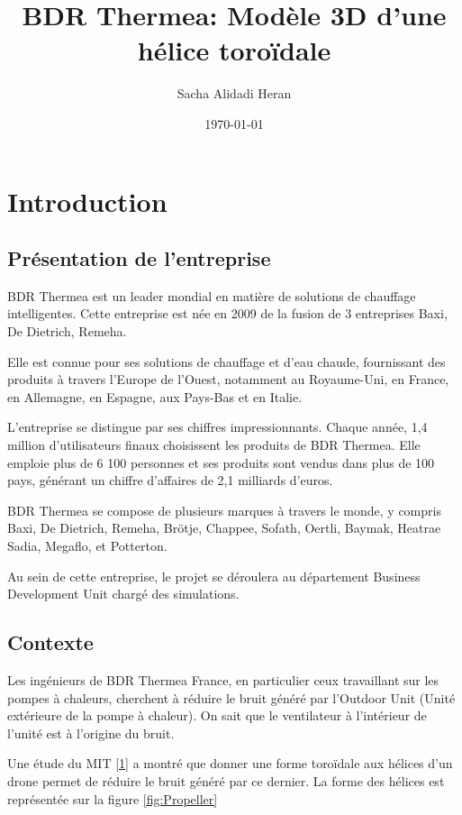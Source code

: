 \documentclass{article}
\title{BDR Thermea: Modèle 3D d'une hélice toroïdale}
\author{Sacha Alidadi Heran}
\date{\today}
\begin{document}
\maketitle

\tableofcontents

\newcommand{\diam}{\text{diam}}

\section{Introduction}

\subsection{Présentation de l'entreprise}

BDR Thermea est un leader mondial en matière de solutions de chauffage intelligentes. Cette entreprise est née en 2009 de la fusion de 3 entreprises Baxi, De Dietrich, Remeha.

Elle est connue pour ses solutions de chauffage et d'eau chaude, fournissant des produits à travers l'Europe de l'Ouest, notamment au Royaume-Uni, en France, en Allemagne, en Espagne, aux Pays-Bas et en Italie.

L'entreprise se distingue par ses chiffres impressionnants. Chaque année, 1,4 million d'utilisateurs finaux choisissent les produits de BDR Thermea. Elle emploie plus de 6 100 personnes et ses produits sont vendus dans plus de 100 pays, générant un chiffre d'affaires de 2,1 milliards d'euros.

BDR Thermea se compose de plusieurs marques à travers le monde, y compris Baxi, De Dietrich, Remeha, Brötje, Chappee, Sofath, Oertli, Baymak, Heatrae Sadia, Megaflo, et Potterton.

Au sein de cette entreprise, le projet se déroulera au département Business Development Unit chargé des simulations.

\subsection{Contexte}

Les ingénieurs de BDR Thermea France, en particulier ceux travaillant sur les pompes à chaleurs, cherchent à réduire le bruit généré par l'Outdoor Unit (Unité extérieure de la pompe à chaleur). On sait que le ventilateur à l'intérieur de l'unité est à l'origine du bruit.

Une étude du MIT \href{https://www.ll.mit.edu/sites/default/files/other/doc/2023-02/TVO_Technology_Highlight_41_Toroidal_Propeller.pdf}{[1]} a montré que donner une forme toroïdale aux hélices d'un drone permet de réduire le bruit généré par ce dernier. La forme des hélices est représentée sur la figure \ref{fig:Propeller}
\end{document}
